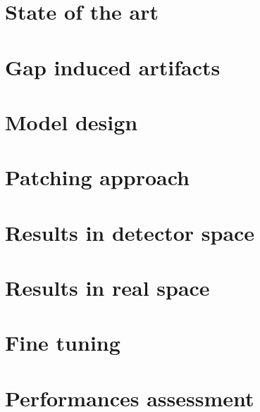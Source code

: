 \chapter{State of the art}\label{chp:inpainting}
\chapter{Gap induced artifacts}\label{chp:phasing}
\chapter{Model design}\label{chp:phasing}
\chapter{Patching approach}\label{chp:phasing}
\chapter{Results in detector space}\label{chp:phasing}
\chapter{Results in real space}\label{chp:phasing}
\chapter{Fine tuning}\label{chp:phasing}
\chapter{Performances assessment}\label{chp:phasing}


